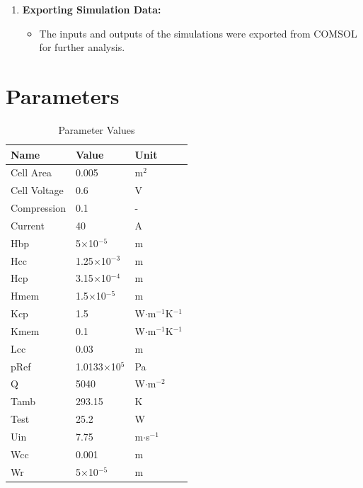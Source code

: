 \begin{enumerate}
        \item \textbf{Exporting Simulation Data:}
        \begin{itemize}
            \item The inputs and outputs of the simulations were exported from COMSOL for further analysis.
        \end{itemize}
    \end{enumerate}

\newpage \section{Parameters}

    \begin{table}[h]
    \centering
    \begin{tabularx}{\textwidth}{X X X}
    \toprule
    \textbf{Name} & \textbf{Value} & \textbf{Unit} \\ 
    \midrule
    Cell Area & 0.005 & m$^2$ \\ 
    Cell Voltage & 0.6 & V \\ 
    Compression & 0.1 & - \\ 
    Current & 40 & A \\ 
    Hbp & 5$\times$10$^{-5}$ & m \\ 
    Hcc & 1.25$\times$10$^{-3}$ & m \\ 
    Hcp & 3.15$\times$10$^{-4}$ & m \\ 
    Hmem & 1.5$\times$10$^{-5}$ & m \\ 
    Kcp & 1.5 & W$\cdot$m$^{-1}$K$^{-1}$ \\ 
    Kmem & 0.1 & W$\cdot$m$^{-1}$K$^{-1}$ \\ 
    Lcc & 0.03 & m \\ 
    pRef & 1.0133$\times$10$^5$ & Pa \\ 
    Q & 5040 & W$\cdot$m$^{-2}$ \\ 
    Tamb & 293.15 & K \\ 
    Test & 25.2 & W \\ 
    Uin & 7.75 & m$\cdot$s$^{-1}$ \\ 
    Wcc & 0.001 & m \\ 
    Wr & 5$\times$10$^{-5}$ & m \\ 
    \bottomrule
    \end{tabularx}
    \caption{Parameter Values}
    \label{tab:parameters}
    \end{table}

